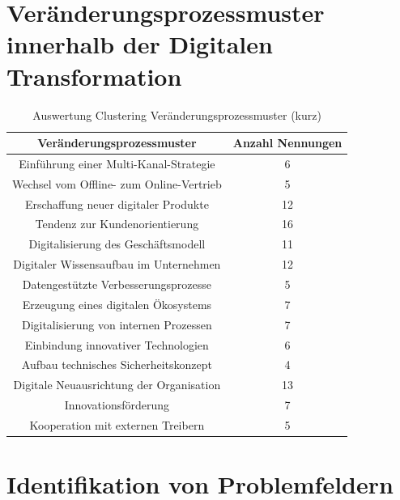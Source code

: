 
\todots

\section{Veränderungsprozessmuster innerhalb der Digitalen Transformation}
\label{problemfields:changepatterns}


\begin{table}[ht]
	\centering
	\caption{Auswertung Clustering Veränderungsprozessmuster (kurz)}
	\begin{tabular}{|c|c|}
		\hline
		\textbf{Veränderungsprozessmuster}& \textbf{Anzahl Nennungen} \\
		\hline
		Einführung einer Multi-Kanal-Strategie   & 6  \\
		Wechsel vom Offline- zum Online-Vertrieb & 5  \\
		Erschaffung neuer digitaler Produkte     & 12 \\
		Tendenz zur Kundenorientierung           & 16 \\
		Digitalisierung des Geschäftsmodell      & 11 \\
		Digitaler Wissensaufbau im Unternehmen   & 12 \\
		Datengestützte Verbesserungsprozesse     & 5  \\
		Erzeugung eines digitalen Ökosystems     & 7  \\
		Digitalisierung von internen Prozessen   & 7  \\
		Einbindung innovativer Technologien      & 6  \\
		Aufbau technisches Sicherheitskonzept    & 4  \\
		Digitale Neuausrichtung der Organisation & 13 \\
		Innovationsförderung                     & 7  \\
		Kooperation mit externen Treibern        & 5 \\
		\hline
	\end{tabular}
	\label{tab:clusteringvpshort}
\end{table}

\todots

\section{Identifikation von Problemfeldern}

